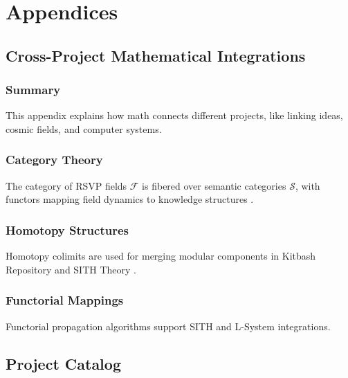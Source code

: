 \documentclass[11pt,oneside]{memoir}
\theoremstyle{plain}
\newcommand{\F}{\mathcal{F}}
\newcommand{\Sfun}{\mathcal{S}}
\begin{document}
\part{Appendices}

\appendix
\chapter{Cross-Project Mathematical Integrations}
\label{app:category_theory}

\section{Summary}
This appendix explains how math connects different projects, like linking ideas, cosmic fields, and computer systems.

\section{Category Theory}
The category of RSVP fields \(\F\) is fibered over semantic categories \(\Sfun\), with functors mapping field dynamics to knowledge structures \cite{maclane}.

\section{Homotopy Structures}
\label{app:homotopy_structures}
Homotopy colimits are used for merging modular components in Kitbash Repository and SITH Theory \cite{lurie}.

\section{Functorial Mappings}
\label{app:functorial_mappings}
Functorial propagation algorithms support SITH and L-System integrations.

\chapter{Project Catalog}
\label{app:project_catalog}
\end{document}
